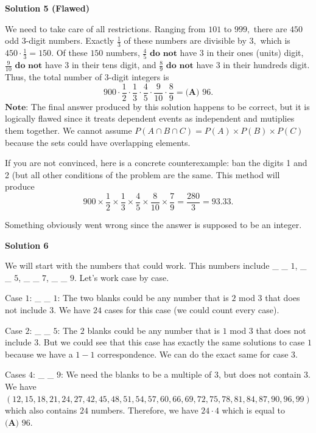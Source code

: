 \begin{enumerate}
\textbf{Solution 5 (Flawed)}

We need to take care of all restrictions. Ranging from $101$ to $999,$ there are $450$ odd $3$-digit numbers. Exactly $\frac{1}{3}$ of these numbers are divisible by $3,$ which is $450\cdot\frac{1}{3}=150.$ Of these $150$ numbers, $\frac{4}{5}$ $\textbf{do not}$ have $3$ in their ones (units) digit, $\frac{9}{10}$ $\textbf{do not}$ have $3$ in their tens digit, and $\frac{8}{9}$ $\textbf{do not}$ have $3$ in their hundreds digit. Thus, the total number of $3$-digit integers is 
 \[900\cdot\frac{1}{2}\cdot\frac{1}{3}\cdot\frac{4}{5}\cdot\frac{9}{10}\cdot\frac{8}{9}=\boxed{\textbf{(A) } 96}.\]
$\textbf{Note:}$ The final answer produced by this solution happens to be correct, but it is logically flawed since it treats dependent events as independent and mutiplies them together. We cannot assume $P(A \cap B \cap C) = P(A) \times P(B) \times P(C)$ because the sets could have overlapping elements. 

 If you are not convinced, here is a concrete counterexample: ban the digits 1 and 2 (but all other conditions of the problem are the same. This method will produce 
 \[900 \times \frac{1}{2} \times \frac{1}{3} \times \frac{4}{5} \times \frac{8}{10} \times \frac{7}{9} = \frac{280}{3} = \mathbf{93.33}.\]

 Something obviously went wrong since the answer is supposed to be an integer.

 



\textbf{Solution 6}

We will start with the numbers that could work. This numbers include \_ \_ $1$, \_ \_ $5$, \_ \_ $7$, \_ \_ $9$. Let's work case by case.

 Case $1$: \_ \_ $1$: The two blanks could be any number that is $2$ mod $3$ that does not include $3$. We have $24$ cases for this case (we could count every case). 

 Case $2$: \_ \_ $5$: The $2$ blanks could be any number that is $1$ mod $3$ that does not include $3$. But we could see that this case has exactly the same solutions to case $1$ because we have a $1-1$ correspondence. We can do the exact same for case $3$. 

 Cases $4$: \_ \_ $9$: We need the blanks to be a multiple of $3$, but does not contain 3. We have $(12, 15, 18, 21, 24, 27, 42, 45, 48, 51, 54, 57, 60, 66, 69, 72, 75, 78, 81, 84, 87, 90, 96, 99)$ which also contains $24$ numbers. Therefore, we have $24 \cdot 4$ which is equal to $\boxed{\textbf{(A) } 96}.$





\end{enumerate}
